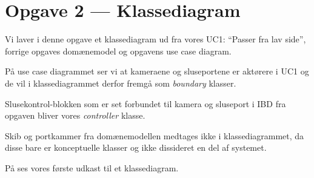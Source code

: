 \section{Opgave 2 --- Klassediagram}

Vi laver i denne opgave et klassediagram ud fra vores UC1: ``Passer fra lav side'', forrige opgaves domænemodel og opgavens use case diagram.

På use case diagrammet ser vi at kameraene og sluseportene er aktørere i UC1 og de vil i klassediagrammet derfor fremgå som \textit{boundary} klasser.

Slusekontrol-blokken som er set forbundet til kamera og sluseport i IBD fra opgaven bliver vores \textit{controller} klasse.

Skib og portkammer fra domænemodellen medtages ikke i klassediagrammet, da disse bare er konceptuelle klasser og ikke dissideret en del af systemet.

På  ses vores første udkast til et klassediagram.

